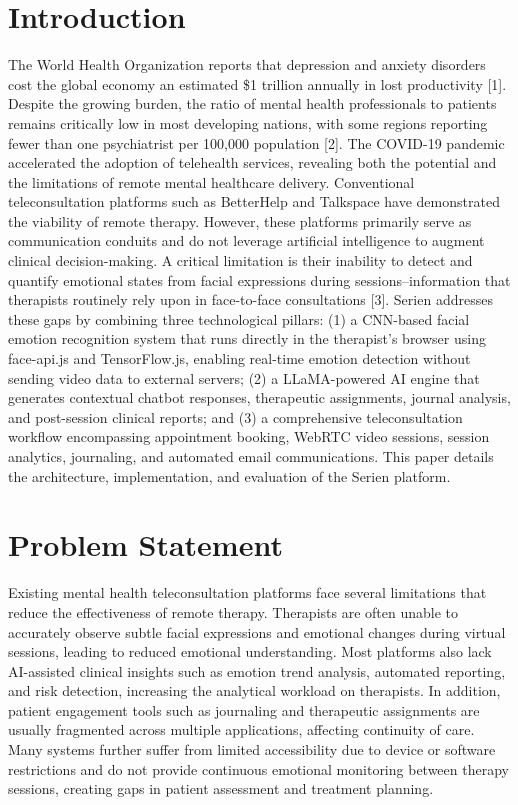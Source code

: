 \documentclass[conference]{IEEEtran}
\begin{document}
\section{Introduction}
The World Health Organization reports that depression and anxiety disorders cost the global economy an estimated \$1 trillion annually in lost productivity [1]. Despite the growing burden, the ratio of mental health professionals to patients remains critically low in most developing nations, with some regions reporting fewer than one psychiatrist per 100,000 population [2]. The COVID-19 pandemic accelerated the adoption of telehealth services, revealing both the potential and the limitations of remote mental healthcare delivery.
Conventional teleconsultation platforms such as BetterHelp and Talkspace have demonstrated the viability of remote therapy. However, these platforms primarily serve as communication conduits and do not leverage artificial intelligence to augment clinical decision-making. A critical limitation is their inability to detect and quantify emotional states from facial expressions during sessions--information that therapists routinely rely upon in face-to-face consultations [3].
Serien addresses these gaps by combining three technological pillars: (1) a CNN-based facial emotion recognition system that runs directly in the therapist's browser using face-api.js and TensorFlow.js, enabling real-time emotion detection without sending video data to external servers; (2) a LLaMA-powered AI engine that generates contextual chatbot responses, therapeutic assignments, journal analysis, and post-session clinical reports; and (3) a comprehensive teleconsultation workflow encompassing appointment booking, WebRTC video sessions, session analytics, journaling, and automated email communications. This paper details the architecture, implementation, and evaluation of the Serien platform.
\section{Problem Statement}
Existing mental health teleconsultation platforms face several limitations that reduce the effectiveness of remote therapy. Therapists are often unable to accurately observe subtle facial expressions and emotional changes during virtual sessions, leading to reduced emotional understanding. Most platforms also lack AI-assisted clinical insights such as emotion trend analysis, automated reporting, and risk detection, increasing the analytical workload on therapists. In addition, patient engagement tools such as journaling and therapeutic assignments are usually fragmented across multiple applications, affecting continuity of care. Many systems further suffer from limited accessibility due to device or software restrictions and do not provide continuous emotional monitoring between therapy sessions, creating gaps in patient assessment and treatment planning.
\end{document}
